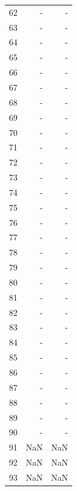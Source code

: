 \begin{appendix}
\begin{table}[h!]
\begin{tabular}{|l|r|r|}
62    & -        & -        \\
63    & -        & -        \\
64    & -        & -        \\
65    & -        & -        \\
66    & -        & -        \\
67    & -        & -        \\
68    & -        & -        \\
69    & -        & -        \\
70    & -        & -        \\
71    & -        & -        \\
72    & -        & -        \\
73    & -        & -        \\
74    & -        & -        \\
75    & -        & -        \\
76    & -        & -        \\
77    & -        & -        \\
78    & -        & -        \\
79    & -        & -        \\
80    & -        & -        \\
81    & -        & -        \\
82    & -        & -        \\
83    & -        & -        \\
84    & -        & -        \\
85    & -        & -        \\
86    & -        & -        \\
87    & -        & -        \\
88    & -        & -        \\
89    & -        & -        \\
90    & -        & -        \\
91    & NaN        & NaN        \\
92    & NaN        & NaN     \\
93    & NaN        & NaN      \\\hline
\end{tabular}
\label{ap:tab3}
\end{table}

\end{appendix}

